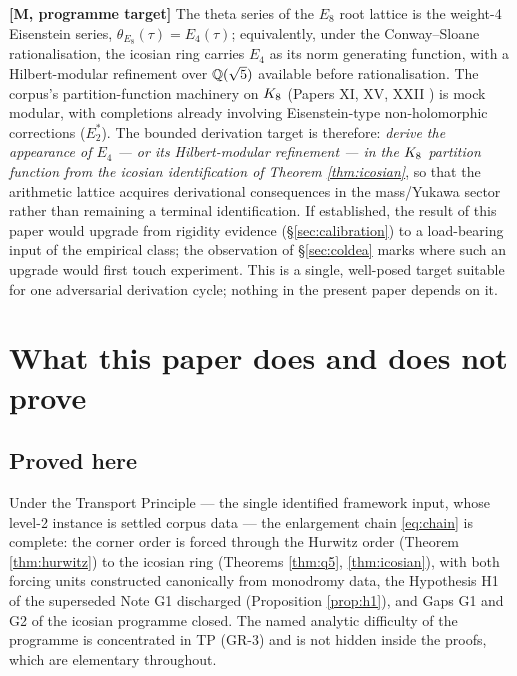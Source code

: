 \documentclass[11pt,a4paper]{article}
\theoremstyle{plain}
\theoremstyle{definition}
\theoremstyle{remark}
\newcommand{\rtag}[1]{\textnormal{\textbf{[#1]}}}
\begin{document}
\rtag{M, programme target} The theta series of the $E_8$ root lattice is the weight-4 Eisenstein series, $\theta_{E_8}(\tau) = E_4(\tau)$; equivalently, under the Conway--Sloane rationalisation, the icosian ring carries $E_4$ as its norm generating function, with a Hilbert-modular refinement over $\mathbb{Q}(\sqrt5)$ available before rationalisation. The corpus's partition-function machinery on $K_8$ (Papers XI, XV, XXII \cite{PaperXI, PaperXV, PaperXXII}) is mock modular, with completions already involving Eisenstein-type non-holomorphic corrections ($E_2^*$). The bounded derivation target is therefore: \emph{derive the appearance of $E_4$ --- or its Hilbert-modular refinement --- in the $K_8$ partition function from the icosian identification of Theorem \ref{thm:icosian}}, so that the arithmetic lattice acquires derivational consequences in the mass/Yukawa sector rather than remaining a terminal identification. If established, the result of this paper would upgrade from rigidity evidence (\S\ref{sec:calibration}) to a load-bearing input of the empirical class; the observation of \S\ref{sec:coldea} marks where such an upgrade would first touch experiment. This is a single, well-posed target suitable for one adversarial derivation cycle; nothing in the present paper depends on it.

\section{What this paper does and does not prove}\label{sec:doesnot}

\subsection{Proved here}
Under the Transport Principle --- the single identified framework input, whose level-2 instance is settled corpus data --- the enlargement chain \eqref{eq:chain} is complete: the corner order is forced through the Hurwitz order (Theorem \ref{thm:hurwitz}) to the icosian ring (Theorems \ref{thm:q5}, \ref{thm:icosian}), with both forcing units constructed canonically from monodromy data, the Hypothesis H1 of the superseded Note G1 discharged (Proposition \ref{prop:h1}), and Gaps G1 and G2 of the icosian programme closed. The named analytic difficulty of the programme is concentrated in TP (GR-3) and is not hidden inside the proofs, which are elementary throughout.
\end{document}
